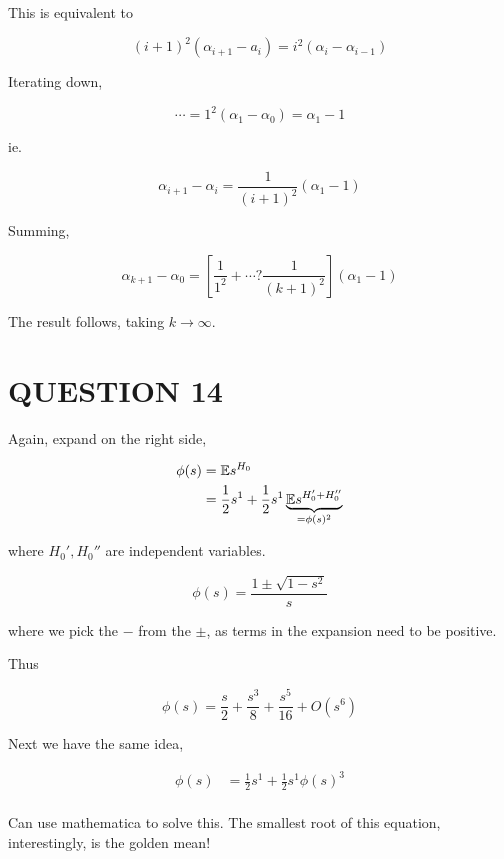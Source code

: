 \documentclass[a4paper]{article}
\begin{document}
This is equivalent to

\[ (i+1)^{2}  (\alpha_{i+1}  - a_{i} ) = i^{2} ( \alpha_{i} - \alpha_{i-1})  \]

Iterating down,

\[ \cdots= 1^{2}  ( \alpha_{1} - \alpha_{0})  = \alpha_{1} - 1  \]


ie.

\[ \alpha_{i+1} - \alpha_{i} = \frac{1}{(i+1)^{2}}(\alpha_{1} - 1) \]

Summing,

\[ \alpha_{k+1} - \alpha_{0} = \left[ \frac{1}{1^{2}}  + \cdots ? \frac{1}{(k+1)^{2}}\right]  (\alpha_{1} - 1) \]

The result follows, taking $ k \to \infty $.



\section{QUESTION 14}


Again, expand on the right side,

\begin{align*}
\phi(s) & = \mathbb{E} s^{H_{0}} \\
& = \frac{1}{2} s^{1} + \frac{1}{2} s^{1} \underbrace{\mathbb{E} s^{H_{0}' + H_{0}''}}_{= \phi(s)^{2}}
\end{align*}

where $ H_{0}',H_{0}'' $ are independent variables.

\[ \phi(s) = \frac{1 \pm \sqrt{1 - s^{2}}}{s} \]

where we pick the $ - $ from the $ \pm $, as terms in the expansion need to be positive. 

Thus

\[ \phi(s) = \frac{s}{2}+\frac{s^3}{8}+\frac{s^5}{16}+O\left(s^6\right) \]

Next we have the same idea,

\begin{align*}
\phi(s) & = \frac{1}{2} s^{1} + \frac{1}{2} s^{1}\phi(s)^{3}  \\
\end{align*}

Can use mathematica to solve this. The smallest root of this equation, interestingly, is the golden mean!
\end{document}
